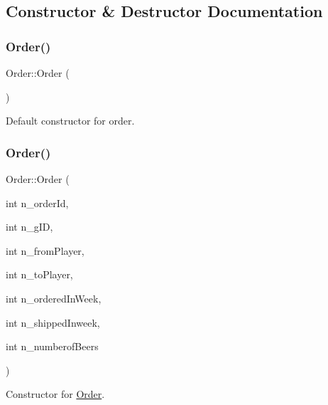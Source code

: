 \subsection{Constructor \& Destructor Documentation}
\mbox{\label{class_order_a7b6a660b03708ed5b4e1c4a6dc2a664a}} 
\subsubsection{\texorpdfstring{Order()}{Order()}\hspace{0.1cm}{\footnotesize\ttfamily [1/2]}}
{\footnotesize\ttfamily Order\+::\+Order (\begin{DoxyParamCaption}{ }\end{DoxyParamCaption})}



Default constructor for order. 

\mbox{\label{class_order_a0c5d4bfa1c8d671665ddd0ecd1cf45d9}} 
\subsubsection{\texorpdfstring{Order()}{Order()}\hspace{0.1cm}{\footnotesize\ttfamily [2/2]}}
{\footnotesize\ttfamily Order\+::\+Order (\begin{DoxyParamCaption}\item[{int}]{n\+\_\+order\+Id,  }\item[{int}]{n\+\_\+g\+ID,  }\item[{int}]{n\+\_\+from\+Player,  }\item[{int}]{n\+\_\+to\+Player,  }\item[{int}]{n\+\_\+ordered\+In\+Week,  }\item[{int}]{n\+\_\+shipped\+Inweek,  }\item[{int}]{n\+\_\+numberof\+Beers }\end{DoxyParamCaption})}



Constructor for \hyperlink{class_order}{Order}. 



